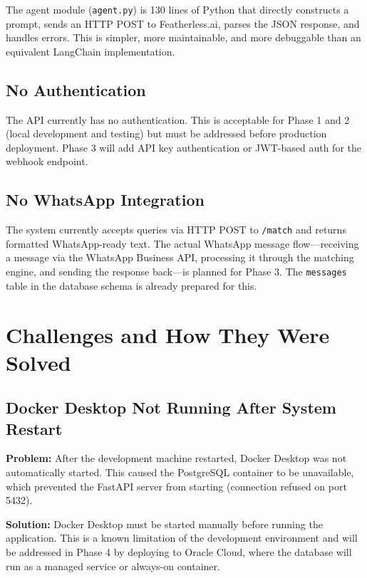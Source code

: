 \documentclass[12pt, a4paper]{report}
\begin{document}
The agent module (\texttt{agent.py}) is 130 lines of Python that directly constructs a prompt, sends an HTTP POST to Featherless.ai, parses the JSON response, and handles errors. This is simpler, more maintainable, and more debuggable than an equivalent LangChain implementation.

\section{No Authentication}

The API currently has no authentication. This is acceptable for Phase 1 and 2 (local development and testing) but must be addressed before production deployment. Phase 3 will add API key authentication or JWT-based auth for the webhook endpoint.

\section{No WhatsApp Integration}

The system currently accepts queries via HTTP POST to \texttt{/match} and returns formatted WhatsApp-ready text. The actual WhatsApp message flow---receiving a message via the WhatsApp Business API, processing it through the matching engine, and sending the response back---is planned for Phase 3. The \texttt{messages} table in the database schema is already prepared for this.

\chapter{Challenges and How They Were Solved}

\section{Docker Desktop Not Running After System Restart}

\textbf{Problem:} After the development machine restarted, Docker Desktop was not automatically started. This caused the PostgreSQL container to be unavailable, which prevented the FastAPI server from starting (connection refused on port 5432).

\textbf{Solution:} Docker Desktop must be started manually before running the application. This is a known limitation of the development environment and will be addressed in Phase 4 by deploying to Oracle Cloud, where the database will run as a managed service or always-on container.
\end{document}
